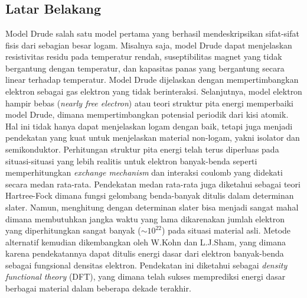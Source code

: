 \chapter{\babSatu}

\section{Latar Belakang}
Model Drude \cite{drude} salah satu model pertama yang berhasil mendeskripsikan sifat-sifat fisis dari sebagian besar logam. Misalnya saja, model Drude dapat menjelaskan resistivitas residu pada temperatur rendah, suseptibilitas magnet yang tidak bergantung dengan temperatur, dan kapasitas panas yang bergantung  secara linear terhadap temperatur. Model Drude dijelaskan dengan mempertimbangkan elektron sebagai gas elektron yang tidak berinteraksi. Selanjutnya, model elektron hampir bebas (\textit{nearly free electron}) atau teori struktur pita energi\cite{ashcroft-mermin} memperbaiki model Drude, dimana mempertimbangkan potensial periodik dari kisi atomik. Hal ini tidak hanya dapat menjelaskan logam dengan baik, tetapi juga menjadi pendekatan yang kuat untuk menjelaskan material non-logam, yakni isolator dan semikonduktor. Perhitungan struktur pita energi telah terus diperluas pada situasi-situasi yang lebih realitis untuk elektron banyak-benda seperti memperhitungkan \textit{exchange mechanism} dan interaksi coulomb yang didekati secara medan rata-rata. Pendekatan medan rata-rata juga diketahui sebagai teori Hartree-Fock dimana fungsi gelombang benda-banyak ditulis dalam determinan slater. Namun, menghitung dengan determinan slater bisa menjadi sangat mahal dimana membutuhkan jangka waktu yang lama dikarenakan jumlah elektron yang diperhitungkan sangat banyak ($\sim 10^{22}$) pada situasi material asli. Metode alternatif kemudian dikembangkan oleh W.Kohn dan L.J.Sham\cite{kohn-sham}, yang dimana karena pendekatannya dapat ditulis energi dasar dari elektron banyak-benda sebagai fungsional densitas elektron. Pendekatan ini diketahui sebagai \textit{density functional theory} (DFT), yang dimana telah sukses memprediksi energi dasar berbagai material dalam beberapa dekade terakhir.

